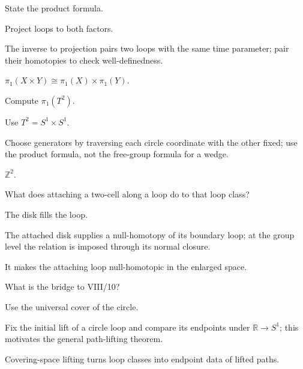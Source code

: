 \begin{exercise}\label{exr:viii09-21}
State the product formula.
\end{exercise}
\begin{hint}
Project loops to both factors.

The inverse to projection pairs two loops with the same time parameter; pair their homotopies to check well-definedness.
\end{hint}
\begin{solution}
\(\pi_1(X\times Y)\cong\pi_1(X)\times\pi_1(Y)\).
\end{solution}

\begin{exercise}\label{exr:viii09-22}
Compute \(\pi_1(T^2)\).
\end{exercise}
\begin{hint}
Use \(T^2=S^1\times S^1\).

Choose generators by traversing each circle coordinate with the other fixed; use the product formula, not the free-group formula for a wedge.
\end{hint}
\begin{solution}
\(\mathbb Z^2\).
\end{solution}

\begin{exercise}\label{exr:viii09-23}
What does attaching a two-cell along a loop do to that loop class?
\end{exercise}
\begin{hint}
The disk fills the loop.

The attached disk supplies a null-homotopy of its boundary loop; at the group level the relation is imposed through its normal closure.
\end{hint}
\begin{solution}
It makes the attaching loop null-homotopic in the enlarged space.
\end{solution}

\begin{exercise}\label{exr:viii09-24}
What is the bridge to VIII/10?
\end{exercise}
\begin{hint}
Use the universal cover of the circle.

Fix the initial lift of a circle loop and compare its endpoints under \(\mathbb R\to S^1\); this motivates the general path-lifting theorem.
\end{hint}
\begin{solution}
Covering-space lifting turns loop classes into endpoint data of lifted paths.
\end{solution}


